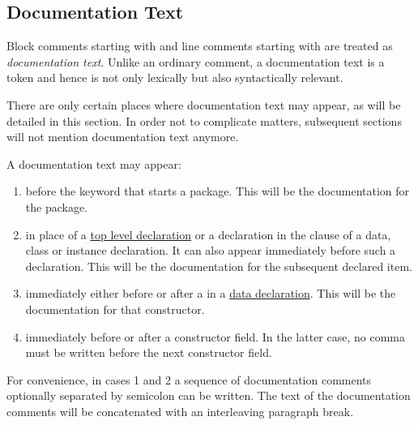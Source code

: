 
\subsection{Documentation Text} \label{doccomment} 

Block comments starting with \regex{\{--} and line comments starting with  \regex{---} are treated as \textit{documentation text}.
Unlike an ordinary comment, a documentation text is a token and hence is not only lexically but also syntactically relevant.

There are only certain places where documentation text may appear, as will be detailed in this section. 
In order not to complicate matters, subsequent sections will not mention documentation text anymore.

A documentation text may appear:
\begin{enumerate}
\item before the  keyword that starts a package. This will be the documentation for the package.
\item in place of a \hyperref[declarations]{top level declaration} or a declaration in the  clause of a data, class or instance declaration. It can also appear immediately before such a declaration.
This will be the documentation for the subsequent declared item. 
\item immediately either before or after a  in a \hyperref[algdcl]{data declaration}. This will be the documentation for that constructor.
\item immediately before or after a constructor field. In the latter case, no comma must be written before the next constructor field. 
\end{enumerate}

For convenience, in cases 1 and 2 a sequence of documentation comments optionally separated by semicolon can be written.
The text of the documentation comments will be concatenated with an interleaving paragraph break.

